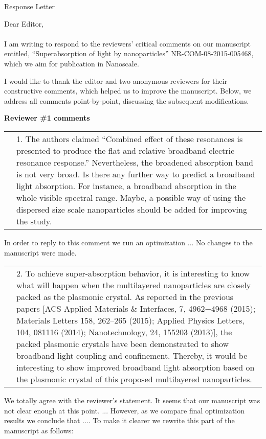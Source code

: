 \documentclass[a4paper]{article}
\begin{document}
\begin{center}
  Response Letter
\end{center}
Dear Editor,
\\
\\
I am writing to respond to the reviewers' critical comments on our
manuscript entitled, ``Superabsorption of light by nanoparticles''
NR-COM-08-2015-005468, which we aim for publication in Nanoscale.

I would like to thank the editor and two anonymous reviewers for their
constructive comments, which helped us to improve the
manuscript. Below, we address all comments point-by-point, discussing
the subsequent modifications.

\vspace{10pt}

\textbf{Reviewer \#1 comments}

\begin{tabular}[!H]{l|p{}}
\quad & 1. The authors claimed “Combined effect of these resonances is presented to produce the flat and relative broadband electric resonance response.” Nevertheless, the broadened absorption band is not very broad. Is there any further way to predict a broadband light absorption. For instance, a broadband absorption in the whole visible spectral range. Maybe, a possible way of using the dispersed size scale nanoparticles should be added for improving the study. 
\end{tabular}

In order to reply to this comment we run an optimization ... No changes
to the manuscript were made.


\begin{tabular}[!H]{l|p{}}
  \quad & 2. To achieve super-absorption behavior, it is interesting
  to know what will happen when the multilayered nanoparticles are
  closely packed as the plasmonic crystal. As reported in the previous
  papers [ACS Applied Materials \& Interfaces, 7, 4962−4968 (2015);
  Materials Letters 158, 262–265 (2015); Applied Physics Letters, 104,
  081116 (2014); Nanotechnology, 24, 155203 (2013)], the packed
  plasmonic crystals have been demonstrated to show broadband light
  coupling and confinement. Thereby, it would be interesting to show
  improved broadband light absorption based on the plasmonic crystal
  of this proposed multilayered nanoparticles. 
\end{tabular}

We totally agree with the reviewer's statement. It seems that our
manuscript was not clear enough at this point. ...  However, as we
compare final optimization results we conclude that .... To make it
clearer we rewrite this part of the manuscript as follows:
\end{document}
